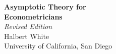 
\begin{titlepage}
\centering
\vspace*{3cm}
{\LARGE\bfseries Asymptotic Theory for\\[0.5em] Econometricians}\\[1.5cm]
{\large\itshape Revised Edition}\\[3cm]
{\Large Halbert White}\\[1cm]
{\large University of California, San Diego}\\[4cm]
\vfill
\end{titlepage}

